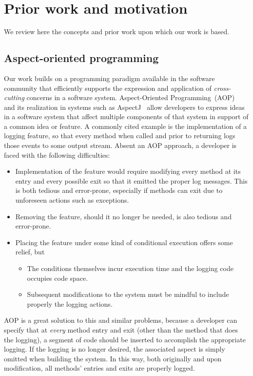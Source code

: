 \documentclass[sigplan,anonymous,review]{acmart}
\begin{document}
\section{Prior work and motivation}\label{sec:prior}

We review here the concepts and prior work upon which our work is based.
\subsection{Aspect-oriented programming}

Our work builds on a programming paradigm available in the software community that efficiently supports the expression and application of \emph{cross-cutting} concerns in a software system.  Aspect-Oriented Programming~(AOP)~\cite{gregor:97} and its realization in systems such as AspectJ~\cite{aspectj} allow developers to express ideas in a software system that affect multiple components of that system in support of a common idea or feature. A commonly cited example is the implementation of a logging feature, so that every method when called and prior to returning logs those events to some output stream. Absent an AOP approach, a developer is faced with the following difficulties:
\begin{itemize}
    \item Implementation of the feature would require modifying every method at its entry and every possible exit so that it emitted the proper log messages.  This is both tedious and error-prone, especially if methods can exit due to unforeseen actions such as exceptions.
    \item Removing the feature, should it no longer be needed, is also tedious and error-prone.
    \item Placing the feature under some kind of conditional execution offers some relief, but
    \begin{itemize}
        \item The conditions themselves incur execution time and the logging code occupies code space.
        \item Subsequent modifications to the system must be mindful to include properly the logging actions.
    \end{itemize}
\end{itemize}
AOP is a great solution to this and similar problems, because a developer can specify that at \emph{every} method entry and exit (other than the method that does the logging), a segment of code should be inserted to accomplish the appropriate logging.  If the logging is no longer desired, the associated aspect is simply omitted when building the system.  In this way, both originally and upon modification, all methods' entries and exits are properly logged.
\end{document}
